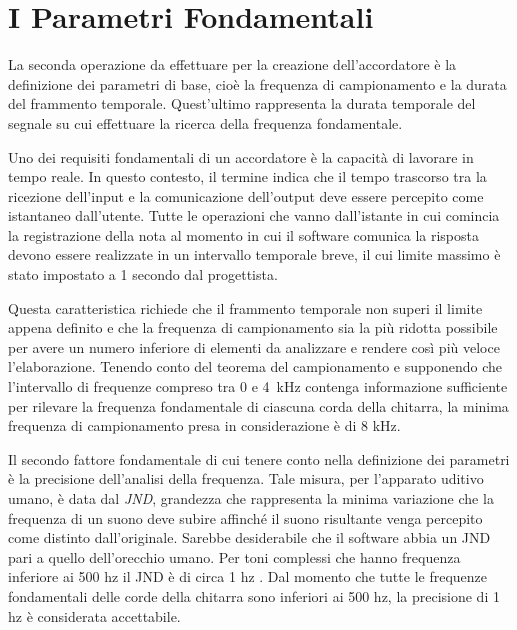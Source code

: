 \chapter{I Parametri Fondamentali}\label{cap:parametri}

La seconda operazione da effettuare per la creazione dell'accordatore è la definizione dei parametri di base, cioè la frequenza di campionamento e la durata del frammento temporale.
Quest'ultimo rappresenta la durata temporale del segnale su cui effettuare la ricerca della frequenza fondamentale.  

Uno dei requisiti fondamentali di un accordatore è la capacità di lavorare in tempo reale. 
In questo contesto, il termine indica che il tempo trascorso tra la ricezione dell'input e la comunicazione dell'output deve essere percepito come istantaneo dall'utente. 
Tutte le operazioni che vanno dall'istante in cui comincia la registrazione della nota al momento in cui il software comunica la risposta devono essere realizzate in un intervallo temporale breve, il cui limite massimo è stato impostato a 1 secondo dal progettista. 

Questa caratteristica richiede che il frammento temporale non superi il limite appena definito e che la frequenza di campionamento sia la più ridotta possibile per avere un numero inferiore di elementi da analizzare e rendere così più veloce l'elaborazione.
Tenendo conto del teorema del campionamento e supponendo che l'intervallo di frequenze compreso tra 0 e \mbox{4 kHz} contenga informazione sufficiente per rilevare la frequenza fondamentale di ciascuna corda della chitarra, la minima frequenza di campionamento presa in considerazione è di 8 kHz.

Il secondo fattore fondamentale di cui tenere conto nella definizione dei parametri è la precisione dell'analisi della frequenza.
Tale misura, per l'apparato uditivo umano, è data dal \emph{JND}, grandezza che rappresenta la minima variazione che la frequenza di un suono deve subire affinché il suono risultante venga percepito come distinto dall'originale.
Sarebbe desiderabile che il software abbia un \mbox{JND} pari a quello dell'orecchio umano. 
Per toni complessi che hanno frequenza inferiore ai 500 hz il \mbox{JND} è di circa 1 hz . 
Dal momento che tutte le frequenze fondamentali delle corde della chitarra sono inferiori ai 500 hz, la precisione di 1 hz è considerata accettabile.

